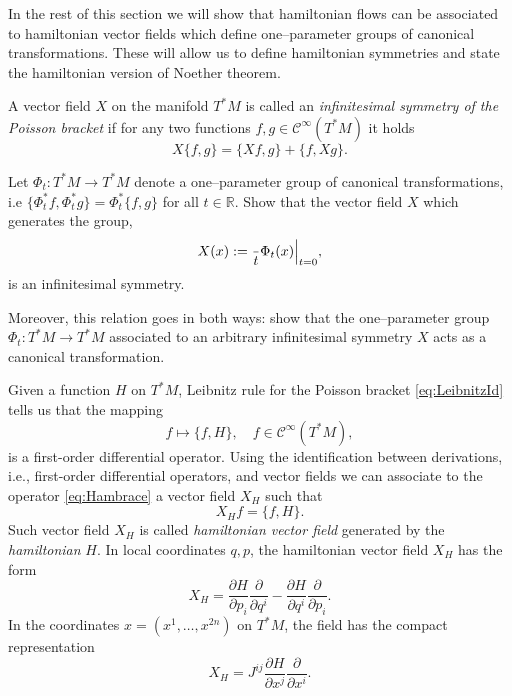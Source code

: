 \documentclass[english,fontsize=11pt,paper=a5,oneside]{scrbook}
\newcommand{\cC}{\mathcal{C}}
\newcommand{\R}{\mathbb{R}}
\let\d\relax
\newcommand{\d}{\mathrm{d}}
\theoremstyle{definition}
\newenvironment{exercise}
  {\pushQED{\qed}\renewcommand{\qedsymbol}{$\maltese$}\exercisex}
  {\popQED\endexercisex}
\begin{document}
In the rest of this section we will show that hamiltonian flows can be associated to hamiltonian vector fields which define one--parameter groups of canonical transformations. These will allow us to define hamiltonian symmetries and state the hamiltonian version of Noether theorem.

\begin{tcolorbox}
  A vector field $X$ on the manifold $T^* M$ is called an \emph{infinitesimal symmetry of the Poisson bracket} if for any two functions $f,g \in \cC^\infty(T^*M)$ it holds
  \begin{equation}\label{eq:infsymm}
    X\big\{f,g\big\} = \big\{X f, g\big\} + \big\{f, X g\big\}.
  \end{equation}
\end{tcolorbox}

\begin{exercise}\label{exe:haminfsym}
  Let $\Phi_t:T^*M \to T^*M$ denote a one--parameter group of canonical transformations, i.e $\big\{\Phi_t^* f, \Phi_t^* g\big\} = \Phi_t^*\big\{f,g\big\}$ for all $t\in\R$.
  Show that the vector field $X$ which generates the group,
  \begin{equation}
    X(x) := \frac{\d }{\d t}\Phi_t(x)\Big|_{t=0},
  \end{equation}
  is an infinitesimal symmetry.

  Moreover, this relation goes in both ways: show that the one--parameter group $\Phi_t:T^*M \to T^*M$ associated to an  arbitrary infinitesimal symmetry $X$ acts as a canonical transformation.
\end{exercise}

Given a function $H$ on $T^* M$, Leibnitz rule for the Poisson bracket \eqref{eq:LeibnitzId} tells us that the mapping
\begin{equation}\label{eq:Hambrace}
  f \mapsto \big\{f,H\big\}, \quad f\in\cC^\infty(T^*M),
\end{equation}
is a first-order differential operator.
Using the identification between derivations, i.e., first-order differential operators, and vector fields we can associate to the operator \eqref{eq:Hambrace} a vector field $X_H$ such that
\begin{equation}
  X_H f = \big\{f, H\big\}.
\end{equation}
Such vector field $X_H$ is called \emph{hamiltonian vector field} generated by the \emph{hamiltonian} $H$.
In local coordinates $q,p$, the hamiltonian vector field $X_H$ has the form
\begin{equation}
  X_H = \frac{\partial H}{\partial p_i} \frac{\partial}{\partial q^i} - \frac{\partial H}{\partial q^i}\frac{\partial}{\partial p_i}.
\end{equation}
In the coordinates $x = (x^1, \ldots, x^{2n})$ on $T^*M$, the field has the compact representation
\begin{equation}
  X_H = J^{ij}\frac{\partial H}{\partial x^j}\frac{\partial}{\partial x^i}.
\end{equation}
\end{document}
